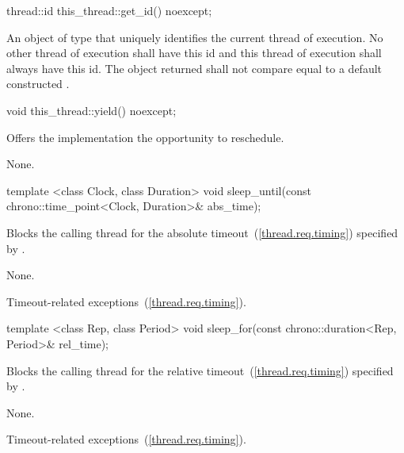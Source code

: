 %
%
\begin{itemdecl}
thread::id this_thread::get_id() noexcept;
\end{itemdecl}

\begin{itemdescr}
\pnum
\returns An object of type  that uniquely identifies the current thread of
execution. No other thread of execution shall have this id and this thread of execution shall
always have this id. The object returned shall not compare equal to a default constructed
.
\end{itemdescr}

%
%
\begin{itemdecl}
void this_thread::yield() noexcept;
\end{itemdecl}

\begin{itemdescr}
\pnum
\effects Offers the implementation the opportunity to reschedule.

\pnum
\sync None.
\end{itemdescr}

%
%
\begin{itemdecl}
template <class Clock, class Duration>
  void sleep_until(const chrono::time_point<Clock, Duration>& abs_time);
\end{itemdecl}

\begin{itemdescr}
\pnum
\effects Blocks the calling thread for the absolute timeout~(\ref{thread.req.timing}) specified
by .

\pnum
\sync None.

\pnum
\throws Timeout-related exceptions~(\ref{thread.req.timing}).
\end{itemdescr}

%
%
\begin{itemdecl}
template <class Rep, class Period>
  void sleep_for(const chrono::duration<Rep, Period>& rel_time);
\end{itemdecl}

\begin{itemdescr}
\pnum
\effects Blocks the calling thread for the relative timeout~(\ref{thread.req.timing}) specified
by .

\pnum
\sync None.

\pnum
\throws Timeout-related exceptions~(\ref{thread.req.timing}).
\end{itemdescr}

